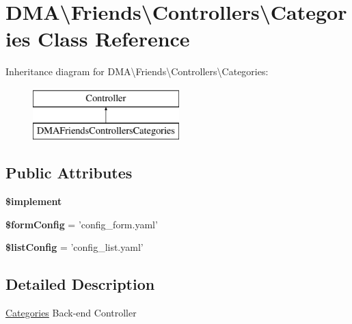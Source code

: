 \hypertarget{classDMA_1_1Friends_1_1Controllers_1_1Categories}{\section{D\-M\-A\textbackslash{}Friends\textbackslash{}Controllers\textbackslash{}Categories Class Reference}
\label{classDMA_1_1Friends_1_1Controllers_1_1Categories}
}
Inheritance diagram for D\-M\-A\textbackslash{}Friends\textbackslash{}Controllers\textbackslash{}Categories\-:\begin{figure}[H]
\begin{center}
\leavevmode
\includegraphics[height=2.000000cm]{d9/daa/classDMA_1_1Friends_1_1Controllers_1_1Categories}
\end{center}
\end{figure}
\subsection*{Public Attributes}
\begin{DoxyCompactItemize}
\item 
{\bfseries \$implement}
\item 
\hypertarget{classDMA_1_1Friends_1_1Controllers_1_1Categories_a7703e05040f63ca4879a67fa7f012505}{{\bfseries \$form\-Config} = 'config\-\_\-form.\-yaml'}\label{classDMA_1_1Friends_1_1Controllers_1_1Categories_a7703e05040f63ca4879a67fa7f012505}

\item 
\hypertarget{classDMA_1_1Friends_1_1Controllers_1_1Categories_a582b40a4ad8ec8bc87d37f6de0a79281}{{\bfseries \$list\-Config} = 'config\-\_\-list.\-yaml'}\label{classDMA_1_1Friends_1_1Controllers_1_1Categories_a582b40a4ad8ec8bc87d37f6de0a79281}

\end{DoxyCompactItemize}


\subsection{Detailed Description}
\hyperlink{classDMA_1_1Friends_1_1Controllers_1_1Categories}{Categories} Back-\/end Controller 

